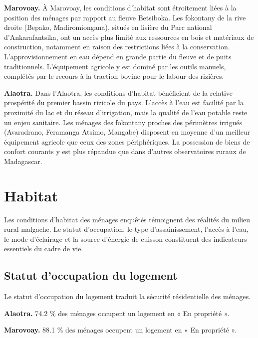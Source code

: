 \documentclass[
  french,
  letterpaper,
]{report}
\begin{document}
\textbf{Marovoay.} À Marovoay, les conditions d'habitat sont étroitement
liées à la position des ménages par rapport au fleuve Betsiboka. Les
fokontany de la rive droite (Bepako, Madiromiongana), situés en lisière
du Parc national d'Ankarafantsika, ont un accès plus limité aux
ressources en bois et matériaux de construction, notamment en raison des
restrictions liées à la conservation. L'approvisionnement en eau dépend
en grande partie du fleuve et de puits traditionnels. L'équipement
agricole y est dominé par les outils manuels, complétés par le recours à
la traction bovine pour le labour des rizières.

\textbf{Alaotra.} Dans l'Alaotra, les conditions d'habitat bénéficient
de la relative prospérité du premier bassin rizicole du pays. L'accès à
l'eau est facilité par la proximité du lac et du réseau d'irrigation,
mais la qualité de l'eau potable reste un enjeu sanitaire. Les ménages
des fokontany proches des périmètres irrigués (Avaradrano, Feramanga
Atsimo, Mangabe) disposent en moyenne d'un meilleur équipement agricole
que ceux des zones périphériques. La possession de biens de confort
courants y est plus répandue que dans d'autres observatoires ruraux de
Madagascar.

\section{Habitat}\label{habitat}

Les conditions d'habitat des ménages enquêtés témoignent des réalités du
milieu rural malgache. Le statut d'occupation, le type d'assainissement,
l'accès à l'eau, le mode d'éclairage et la source d'énergie de cuisson
constituent des indicateurs essentiels du cadre de vie.

\subsection{Statut d'occupation du
logement}\label{statut-doccupation-du-logement}

Le statut d'occupation du logement traduit la sécurité résidentielle des
ménages.

\textbf{Alaotra.} 74.2 \% des ménages occupent un logement en « En
propriété ».

\textbf{Marovoay.} 88.1 \% des ménages occupent un logement en « En
propriété ».
\end{document}
